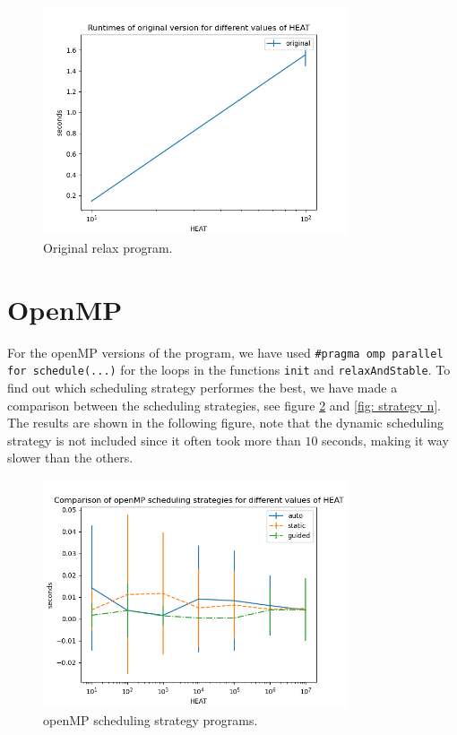 \documentclass[a4paper]{article}
\begin{document}
\begin{figure}[H]
    \centering
    \includegraphics[width = 0.8\textwidth]{graphs/heat/Runtimes of original version for different values of HEAT.png}
    \caption{Original relax program.}
    \label{fig: orig heat}
\end{figure}

\section{OpenMP}
For the openMP versions of the program, we have used \texttt{\#pragma omp parallel for schedule(...)} for the loops in the functions \texttt{init} and \texttt{relaxAndStable}. To find out which scheduling strategy performes the best, we have made a comparison between the scheduling strategies, see figure \ref{fig: strategy heat} and \ref{fig: strategy n}. The results are shown in the following figure, note that the dynamic scheduling strategy is not included since it often took more than $10$ seconds, making it way slower than the others.

\begin{figure}[H]
    \centering
    \includegraphics[width = 0.8\textwidth]{graphs/Comparison of openMP scheduling strategies for different values of HEAT.png}
    \caption{openMP scheduling strategy programs.}
    \label{fig: strategy heat}
\end{figure}
\end{document}
